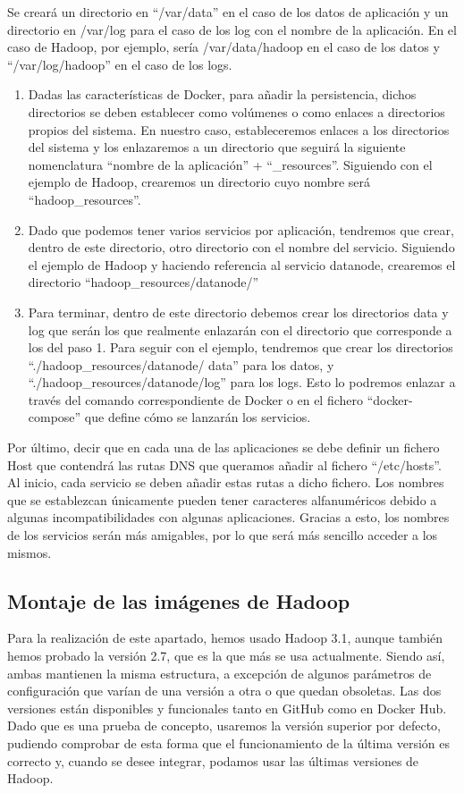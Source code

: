 Se creará un directorio en “/var/data” en el caso de los datos de aplicación y un directorio en /var/log para el caso de los log con el nombre de la aplicación. En el caso de Hadoop, por ejemplo, sería     /var/data/hadoop en el caso de los datos y “/var/log/hadoop” en el caso de los logs.
\begin{enumerate}

\item Dadas las características de Docker, para añadir la persistencia, dichos directorios se deben establecer como volúmenes o como enlaces a directorios propios del sistema. En nuestro caso, estableceremos enlaces a los directorios del sistema y los enlazaremos a un directorio que seguirá la siguiente nomenclatura “nombre de la aplicación” + “\_resources”. Siguiendo con el ejemplo de Hadoop, crearemos un directorio cuyo nombre será     “hadoop\_resources”.

\item Dado que podemos tener varios servicios por aplicación, tendremos que crear, dentro de este directorio, otro directorio con el nombre del servicio. Siguiendo el ejemplo de Hadoop y haciendo referencia al servicio datanode, crearemos el directorio “hadoop\_resources/datanode/”

\item Para terminar, dentro de este directorio debemos crear los directorios data y log que serán los que realmente enlazarán con el directorio que corresponde a los del paso 1. Para seguir con el ejemplo, tendremos que crear los directorios “./hadoop\_resources/datanode/ data” para los datos, y “./hadoop\_resources/datanode/log” para los logs. Esto lo podremos enlazar a través del comando correspondiente de Docker o en el fichero “docker-compose” que define cómo se lanzarán los servicios.

\end{enumerate}

Por último, decir que en cada una de las aplicaciones se debe definir un fichero Host que contendrá las rutas DNS que queramos añadir al fichero “/etc/hosts”. Al inicio, cada servicio se deben añadir estas rutas a dicho fichero. Los nombres que se establezcan únicamente pueden tener caracteres alfanuméricos debido a algunas incompatibilidades con algunas aplicaciones. Gracias a esto, los nombres de los servicios serán más amigables, por lo que será más sencillo acceder a los mismos.

\subsection {Montaje de las imágenes de Hadoop\label{montHadoop}}
Para la realización de este apartado, hemos usado Hadoop 3.1, aunque también hemos probado la versión 2.7, que es la que más se usa actualmente. Siendo así, ambas mantienen la misma estructura, a excepción de algunos parámetros de configuración que varían de una versión a otra o que quedan obsoletas. Las dos versiones están disponibles y funcionales tanto en GitHub como en Docker Hub. Dado que es una prueba de concepto, usaremos la versión superior por defecto, pudiendo comprobar de esta forma que el funcionamiento de la última versión es correcto y, cuando se desee integrar, podamos usar las últimas versiones de Hadoop.

